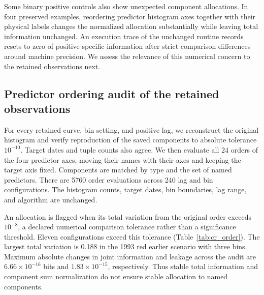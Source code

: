 \begin{table}[H]
\centering
\caption{Median joint information $I$ in bits and normalized leakage
$\ell$ under independent categorical variables, from 200 draws per setting.
Exact truth is $I=0$ and $\ell=1$. The 512 tuple setting is an artificial
reference. None of these values is a significance threshold for the AGN.}
\label{tab:cr_calibration}
\small

\end{table}

Some binary positive controls also show unexpected component allocations.
In four preserved examples, reordering predictor histogram axes together
with their physical labels changes the normalized allocation substantially
while leaving total information unchanged. An execution trace of the
unchanged routine records resets to zero of positive specific information
after strict comparison differences around machine precision. We assess
the relevance of this numerical concern to the retained observations next.

\subsection{Predictor ordering audit of the retained observations}

For every retained curve, bin setting, and positive lag, we reconstruct
the original histogram and verify reproduction of the saved components
to absolute tolerance $10^{-10}$. Target dates and tuple counts also
agree. We then evaluate all 24 orders of the four predictor axes, moving
their names with their axes and keeping the target axis fixed. Components
are matched by type and the set of named predictors. There are 5760 order
evaluations across 240 lag and bin configurations. The histogram counts,
target dates, bin boundaries, lag range, and algorithm are unchanged.

An allocation is flagged when its total variation from the original order
exceeds $10^{-8}$, a declared numerical comparison tolerance rather than a
significance threshold. Eleven configurations exceed this tolerance
(Table~\ref{tab:cr_order}). The largest total variation is 0.188 in the
1993 red earlier scenario with three bins. Maximum absolute changes in
joint information and leakage across the audit are
$6.66\times10^{-16}$ bits and $1.83\times10^{-15}$, respectively.
Thus stable total information and component sum normalization do not ensure
stable allocation to named components.

